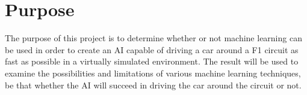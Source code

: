 \chapter{Purpose}
The purpose of this project is to determine whether or not machine learning can be used in order to create an AI capable of driving a car around a F1 circuit as fast as possible in a virtually simulated environment. The result will be used to examine the possibilities and limitations of various machine learning techniques, be that whether the AI will succeed in driving the car around the circuit or not. 

